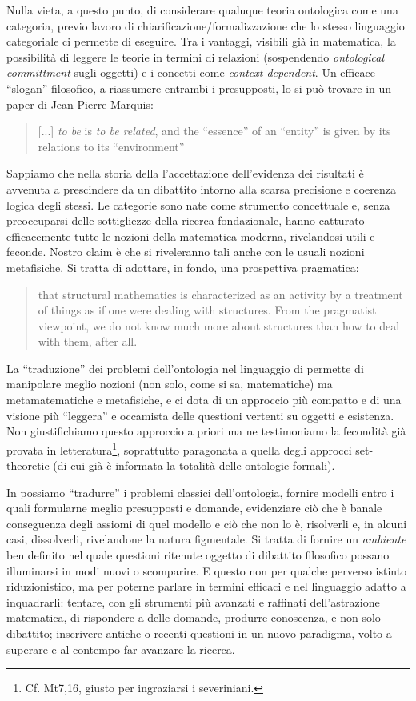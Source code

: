Nulla vieta, a questo punto, di considerare qualuque teoria ontologica come una categoria, previo lavoro di chiarificazione/formalizzazione che lo stesso linguaggio categoriale ci permette di eseguire. Tra i vantaggi, visibili già in matematica, la possibilità di leggere le teorie in termini di relazioni (sospendendo \emph{ontological committment} sugli oggetti) e i concetti come \emph{context-dependent}. Un efficace ``slogan'' filosofico, a riassumere entrambi i presupposti, lo si può trovare in un paper di Jean-Pierre Marquis:
\begin{quote}
	[...] \emph{to be} is \emph{to be related}, and the ``essence'' of an ``entity'' is given by its relations to its ``environment''
	\hfill \cite{Marquis1997}
\end{quote}
Sappiamo che nella storia della \CT l'accettazione dell'evidenza dei risultati è avvenuta a prescindere da un dibattito intorno alla scarsa precisione e coerenza logica degli stessi. Le categorie sono nate come strumento concettuale e, senza preoccuparsi delle sottigliezze della ricerca fondazionale, hanno catturato efficacemente tutte le nozioni della matematica moderna, rivelandosi utili e feconde. Nostro claim è che si riveleranno tali anche con le usuali nozioni metafisiche. Si tratta di adottare, in fondo, una prospettiva pragmatica:
\begin{quote}
	that structural mathematics is characterized as an activity by a treatment of things as if one were dealing with structures. From the pragmatist viewpoint, we do not know much more about structures than how to deal with them, after all. \hfill \cite{kromer2007tool}
\end{quote}
La ``traduzione'' dei problemi dell'ontologia nel linguaggio di \CT permette di manipolare meglio nozioni (non solo, come si sa, matematiche) ma metamatematiche e metafisiche, e ci dota di un approccio più compatto e di una visione più ``leggera'' e occamista delle questioni vertenti su oggetti e esistenza. Non giustifichiamo questo approccio a priori ma ne testimoniamo la fecondità già provata in letteratura\footnote{Cf. Mt7,16, giusto per ingraziarsi i severiniani.}, soprattutto paragonata a quella degli approcci set-theoretic (di cui già è informata la totalità delle ontologie formali).

In \CT possiamo ``tradurre'' i problemi classici dell'ontologia, fornire modelli entro i quali formularne meglio presupposti e domande, evidenziare ciò che è banale conseguenza degli assiomi di quel modello e ciò che non lo è, risolverli e, in alcuni casi, dissolverli, rivelandone la natura figmentale. Si tratta di fornire un \emph{ambiente} ben definito nel quale questioni ritenute oggetto di dibattito filosofico possano illuminarsi in modi nuovi o scomparire. E questo non per qualche perverso istinto riduzionistico, ma per poterne parlare in termini efficaci e nel linguaggio adatto a inquadrarli: tentare, con gli strumenti più avanzati e raffinati dell'astrazione matematica, di rispondere a delle domande, produrre conoscenza, e non solo dibattito; inscrivere antiche o recenti questioni in un nuovo paradigma, volto a superare e al contempo far avanzare la ricerca.

